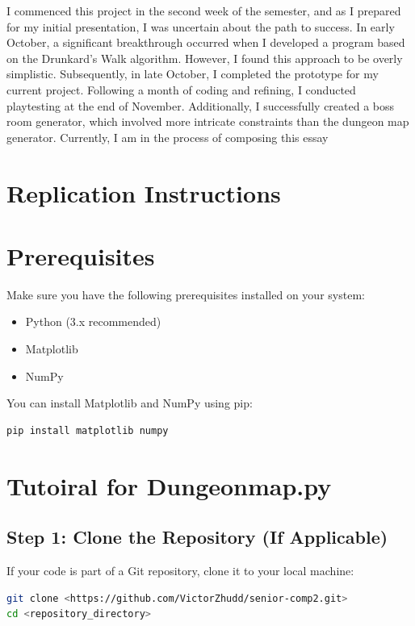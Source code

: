 \documentclass[10pt,twocolumn]{article}
\begin{document}
I commenced this project in the second week of the semester, and as I prepared for my initial presentation, I was uncertain about the path to success. In early October, a significant breakthrough occurred when I developed a program based on the Drunkard's Walk algorithm. However, I found this approach to be overly simplistic. Subsequently, in late October, I completed the prototype for my current project. Following a month of coding and refining, I conducted playtesting at the end of November. Additionally, I successfully created a boss room generator, which involved more intricate constraints than the dungeon map generator. Currently, I am in the process of composing this essay

\section{Replication Instructions}
\section{Prerequisites}

Make sure you have the following prerequisites installed on your system:

\begin{itemize}
    \item Python (3.x recommended)
    \item Matplotlib
    \item NumPy
\end{itemize}

You can install Matplotlib and NumPy using pip:

\begin{lstlisting}[language=bash]
pip install matplotlib numpy
\end{lstlisting}
\section{Tutoiral for Dungeonmap.py}
\subsection{Step 1: Clone the Repository (If Applicable)}

If your code is part of a Git repository, clone it to your local machine:

\begin{lstlisting}[language=bash]
git clone <https://github.com/VictorZhudd/senior-comp2.git>
cd <repository_directory>
\end{lstlisting}
\end{document}
